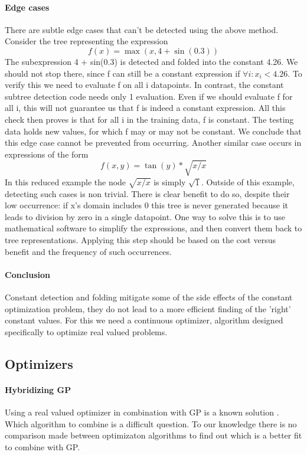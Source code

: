 \paragraph{Edge cases}
There are subtle edge cases that can't be detected using the above method. Consider the tree representing the expression
\[
f(x) = \max(x, 4 + \sin(0.3)) 
\]
The subexpression 4 + sin(0.3) is detected and folded into the constant 4.26. 
We should not stop there, since f can still be a constant expression if $\forall i :  x_i < 4.26$. To verify this we need to evaluate f on all i datapoints. In contrast, the constant subtree detection code needs only 1 evaluation. Even if we should evaluate f for all i, this will not guarantee us that f is indeed a constant expression. All this check then proves is that for all i in the training data, f is constant. The testing data holds new values, for which f may or may not be constant. We conclude that this edge case cannot be prevented from occurring.
Another similar case occurs in expressions of the form 
\[
f(x, y) = \tan(y) * \sqrt{x/x}
\]
In this reduced example the node $\sqrt{x/x}$ is simply $\sqrt{1}$. Outside of this example, detecting such cases is non trivial. There is clear benefit to do so, despite their low occurrence: if x's domain includes 0 this tree is never generated because it leads to division by zero in a single datapoint. One way to solve this is to use mathematical software to simplify the expressions, and then convert them back to tree representations. Applying this step should be based on the cost versus benefit and the frequency of such occurrences. %
\paragraph{Conclusion}
Constant detection and folding mitigate some of the side effects of the constant optimization problem, they do not lead to a more efficient finding of the 'right' constant values. For this we need a continuous optimizer, algorithm designed specifically to optimize real valued problems.
\subsection{Optimizers}
\paragraph{Hybridizing GP}
Using a real valued optimizer in combination with GP is a known solution \cite{GEDE, GPConst}.
Which algorithm to combine is a difficult question. To our knowledge there is no comparison made between optimizaton algorithms to find out which is a better fit to combine with GP. 
